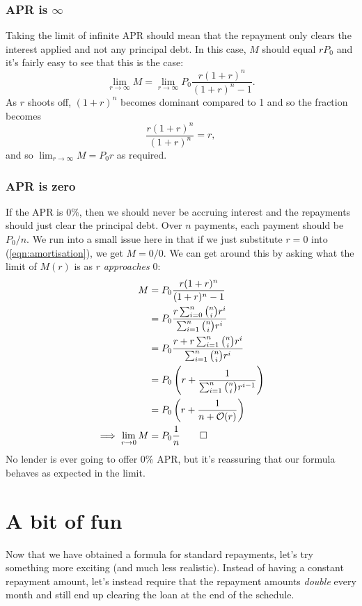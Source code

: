 \documentclass[]{scrartcl}
\theoremstyle{definition}
\let\oldref\ref
\renewcommand{\ref}[1]{(\oldref{#1})}
\begin{document}
\subsubsection{APR is $\infty$}
Taking the limit of infinite APR should mean that the repayment only clears the interest applied and not any principal debt. In this case, $M$ should equal $rP_0$ and it's fairly easy to see that this is the case:
\[
    \lim_{r\rightarrow \infty} M = \lim_{r\rightarrow \infty} P_0\frac{r(1+r)^n}{(1+r)^n - 1}.
\]
As $r$ shoots off, $(1+r)^n$ becomes dominant compared to 1 and so the fraction becomes
\[
\frac{r(1+r)^n}{(1+r)^n} = r,
\]
and so $\lim_{r\rightarrow \infty}M = P_0r$ as required.

\subsubsection{APR is zero}
If the APR is $0$\%, then we should never be accruing interest and the repayments should just clear the principal debt. Over $n$ payments, each payment should be $P_0/n$. We run into a small issue here in that if we just substitute $r=0$ into \ref{eqn:amortisation}, we get $M = 0/0$. We can get around this by asking what the limit of $M(r)$ is as $r$ \textit{approaches} 0:
\begin{align*}
    M &= P_0 \frac{r(1+r)^n}{(1+r)^n - 1} \\
      &= P_0 \frac{r\sum_{i=0}^{n}\binom{n}{i}r^i}{\sum_{i=1}^{n}\binom{n}{i}r^i} \\
      &= P_0 \frac{r + r\sum_{i=1}^{n}\binom{n}{i}r^i}{\sum_{i=1}^{n}\binom{n}{i}r^i} \\
      &= P_0 \left( r + \frac{1}{\sum_{i=1}^{n}\binom{n}{i}r^{i-1}}\right) \\
      &= P_0 \left( r + \frac{1}{n + \mathcal{O}(r)}\right) \\
    \implies \lim_{r \rightarrow 0} M &= P_0\frac{1}{n} \qed
\end{align*}
No lender is ever going to offer 0\% APR, but it's reassuring that our formula behaves as expected in the limit.

\section{A bit of fun}
Now that we have obtained a formula for standard repayments, let's try something more exciting (and much less realistic). Instead of having a constant repayment amount, let's instead require that the repayment amounts \textit{double} every month and still end up clearing the loan at the end of the schedule.
\end{document}

